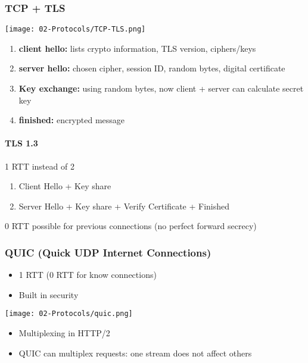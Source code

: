 \subsubsection{TCP + TLS}
\begin{center}
    \texttt{[image: 02-Protocols/TCP-TLS.png]}
\end{center}
\begin{enumerate}
    \item \textbf{client hello:} lists crypto information, TLS version, ciphers/keys
    \item \textbf{server hello:} chosen cipher, session ID, random bytes, digital certificate
    \item \textbf{Key exchange:} using random bytes, now client + server can calculate secret key
    \item \textbf{finished:} encrypted message
\end{enumerate}
\paragraph{TLS 1.3}
1 RTT instead of 2
\begin{enumerate}
    \item Client Hello + Key share
    \item Server Hello + Key share + Verify Certificate + Finished
\end{enumerate}
0 RTT possible for previous connections (no perfect forward secrecy)

\subsubsection{QUIC (Quick UDP Internet Connections)}
\begin{itemize}
    \item 1 RTT (0 RTT for know connections)
    \item Built in security
\end{itemize}
\begin{center}
    \texttt{[image: 02-Protocols/quic.png]}    
\end{center}
\begin{itemize}
    \item Multiplexing in HTTP/2
    \item QUIC can multiplex requests: one stream does not affect others
\end{itemize}

